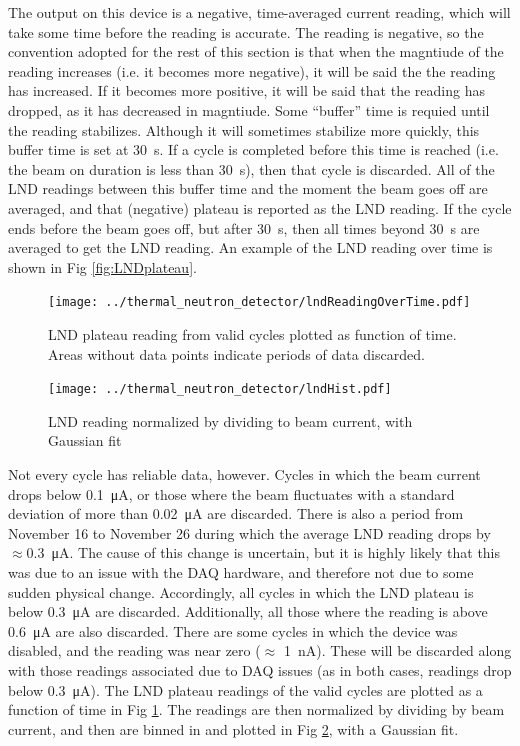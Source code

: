 \documentclass[10pt,letterpaper]{article}
\begin{document}
The output on this device is a negative, time-averaged current reading, which will take some time before the reading is accurate. The reading is negative, so the convention adopted for the rest of this section is that when the magntiude of the reading increases (i.e. it becomes more negative), it will be said the the reading has increased. If it becomes more positive, it will be said that the reading has dropped, as it has decreased in magntiude. Some ``buffer'' time is requied until the reading stabilizes. Although it will sometimes stabilize more quickly, this buffer time is set at \SI{30}{\second}. If a cycle is completed before this time is reached (i.e. the beam on duration is less than \SI{30}{\second}), then that cycle is discarded. All of the LND readings between this buffer time and the moment the beam goes off are averaged, and that (negative) plateau is reported as the LND reading. If the cycle ends before the beam goes off, but after \SI{30}{\second}, then all times beyond \SI{30}{\second} are averaged to get the LND reading. An example of the LND reading over time is shown in Fig \ref{fig:LNDplateau}.

\begin{figure}
\centering
\texttt{[image: ../thermal\_neutron\_detector/lndReadingOverTime.pdf]}
\caption{LND plateau reading from valid cycles plotted as function of time. Areas without data points indicate periods of data discarded.}
\label{fig:LNDreadings}
\end{figure}

\begin{figure}
\centering
\texttt{[image: ../thermal\_neutron\_detector/lndHist.pdf]}
\caption{LND reading normalized by dividing to beam current, with Gaussian fit}
\label{fig:LNDhist}
\end{figure}

Not every cycle has reliable data, however. Cycles in which the beam current drops below \SI{0.1}{\micro\ampere}, or those where the beam fluctuates with a standard deviation of more than \SI{0.02}{\micro\ampere} are discarded. There is also a period from November 16 to November 26 during which the average LND reading drops by $\approx$\SI{0.3}{\micro\ampere}. The cause of this change is uncertain, but it is highly likely that this was due to an issue with the DAQ hardware, and therefore not due to some sudden physical change. Accordingly, all cycles in which the LND plateau is below \SI{0.3}{\micro\ampere} are discarded. Additionally, all those where the reading is above \SI{0.6}{\micro\ampere} are also discarded. There are some cycles in which the device was disabled, and the reading was near zero ($\approx$ \SI{1}{\nano\ampere}). These will be discarded along with those readings associated due to DAQ issues (as in both cases, readings drop below \SI{0.3}{\micro\ampere}). The LND plateau readings of the valid cycles are plotted as a function of time in Fig \ref{fig:LNDreadings}. The readings are then normalized by dividing by beam current, and then are binned in and plotted in Fig \ref{fig:LNDhist}, with a Gaussian fit.
\end{document}
